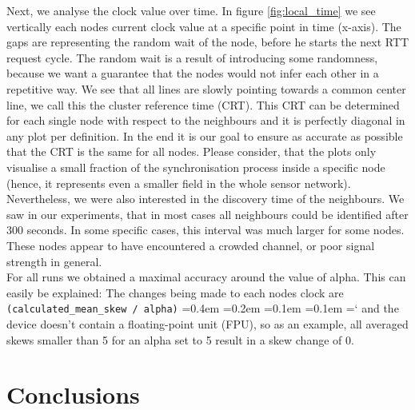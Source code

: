 \documentclass{llncs}
\newcommand{\code}[1]{%
	\texttt{#1}%
	\fontdimen2\font=0.4em
	\fontdimen3\font=0.2em
	\fontdimen4\font=0.1em
	\fontdimen7\font=0.1em
	\hyphenchar\font=`\-
}
\begin{document}
	\noindent Next, we analyse the clock value over time. In figure \ref{fig:local_time} we see vertically each nodes current clock value at a specific point in time (x-axis). The gaps are representing the random wait of the node, before he starts the next RTT request cycle. The random wait is a result of introducing some randomness, because we want a guarantee that the nodes would not infer each other in a repetitive way. We see that all lines are slowly pointing towards a common center line, we call this the cluster reference time (CRT). This CRT can be determined for each single node with respect to the neighbours and it is perfectly diagonal in any plot per definition. In the end it is our goal to ensure as accurate as possible that the CRT is the same for all nodes. Please consider, that the plots only visualise a small fraction of the synchronisation process inside a specific node (hence, it represents even a smaller field in the whole sensor network).\\
	
	\noindent Nevertheless, we were also interested in the discovery time of the neighbours. We saw in our experiments, that  in most cases all neighbours could be identified after 300 seconds. In some specific cases, this interval was much larger for some nodes. These nodes appear to have encountered a crowded channel, or poor signal strength in general.\\
	
	\noindent For all runs we obtained a maximal accuracy around the value of alpha. This can easily be explained: The changes being made to each nodes clock are \code{(calculated\_mean\_skew / alpha)} and the device doesn't contain a float\-ing-point unit (FPU), so as an example, all averaged skews smaller than 5 for an alpha set to 5 result in a skew change of 0.
	
	\section{Conclusions}
	
\end{document}
